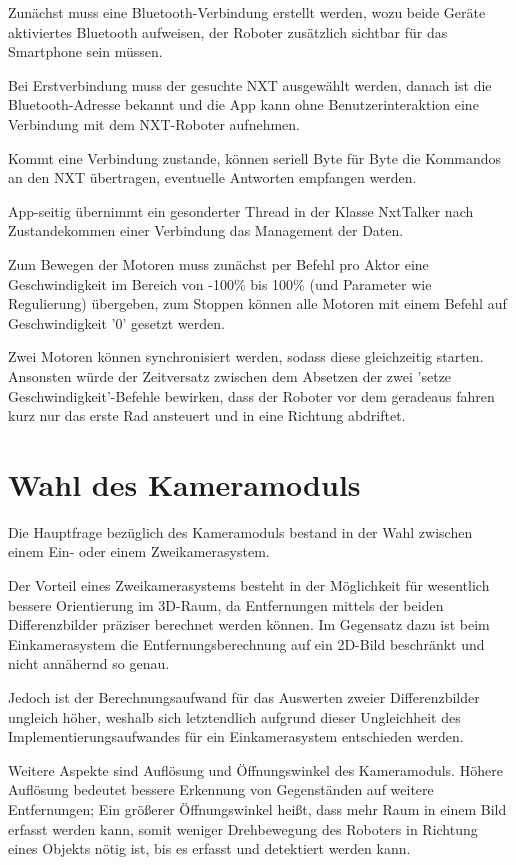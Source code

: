 Zunächst muss eine Bluetooth-Verbindung erstellt werden, wozu beide Geräte aktiviertes Bluetooth aufweisen, der Roboter zusätzlich sichtbar für das Smartphone sein müssen.

Bei Erstverbindung muss der gesuchte NXT ausgewählt werden, danach ist die Bluetooth-Adresse bekannt und die App kann ohne Benutzerinteraktion eine Verbindung mit dem NXT-Roboter aufnehmen.

Kommt eine Verbindung zustande, können seriell Byte für Byte die Kommandos an den NXT übertragen, eventuelle Antworten empfangen werden.

App-seitig übernimmt ein gesonderter Thread in der Klasse NxtTalker nach Zustandekommen einer Verbindung das Management der Daten.

Zum Bewegen der Motoren muss zunächst per Befehl pro Aktor eine Geschwindigkeit im Bereich von -100\% bis 100\% (und Parameter wie Regulierung) übergeben, zum Stoppen können alle Motoren mit einem Befehl auf Geschwindigkeit '0' gesetzt werden.

Zwei Motoren können synchronisiert werden, sodass diese gleichzeitig starten. Ansonsten würde der Zeitversatz zwischen dem Absetzen der zwei 'setze Geschwindigkeit'-Befehle bewirken, dass der Roboter vor dem geradeaus fahren kurz nur das erste Rad ansteuert und in eine Richtung abdriftet.

\section{Wahl des Kameramoduls}
\label{sec:Kamera}

Die Hauptfrage bezüglich des Kameramoduls bestand in der Wahl zwischen einem Ein- oder einem Zweikamerasystem.

Der Vorteil eines Zweikamerasystems besteht in der Möglichkeit für wesentlich bessere Orientierung im 3D-Raum, da Entfernungen mittels der beiden Differenzbilder präziser berechnet werden können.
Im Gegensatz dazu ist beim Einkamerasystem die Entfernungsberechnung auf ein 2D-Bild beschränkt und nicht annähernd so genau.

Jedoch ist der Berechnungsaufwand für das Auswerten zweier Differenzbilder ungleich höher, weshalb sich letztendlich aufgrund dieser Ungleichheit des Implementierungsaufwandes für ein Einkamerasystem entschieden werden.

Weitere Aspekte sind Auflösung und Öffnungswinkel des Kameramoduls.
Höhere Auflösung bedeutet bessere Erkennung von Gegenständen auf weitere Entfernungen; Ein größerer Öffnungswinkel heißt, dass mehr Raum in einem Bild erfasst werden kann, somit weniger Drehbewegung des Roboters in Richtung eines Objekts nötig ist, bis es erfasst und detektiert werden kann.

